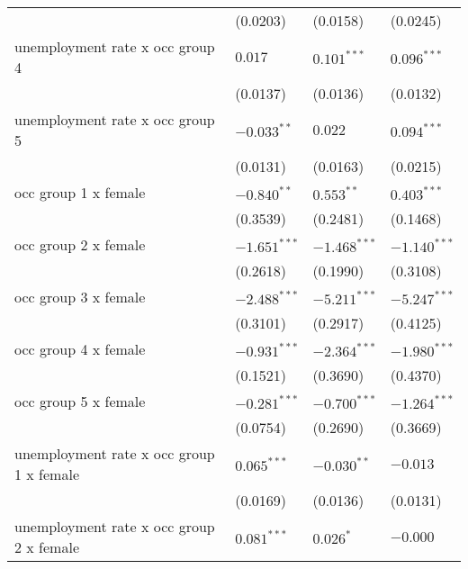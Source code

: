 \begin{tabular}{llll}
                                         &           (0.0203) &           (0.0158) &           (0.0245) \\
unemployment rate x occ group 4          &            $0.017$ &      $0.101^{***}$ &      $0.096^{***}$ \\
                                         &           (0.0137) &           (0.0136) &           (0.0132) \\
unemployment rate x occ group 5          &      $-0.033^{**}$ &            $0.022$ &      $0.094^{***}$ \\
                                         &           (0.0131) &           (0.0163) &           (0.0215) \\
occ group 1 x female                     &      $-0.840^{**}$ &       $0.553^{**}$ &      $0.403^{***}$ \\
                                         &           (0.3539) &           (0.2481) &           (0.1468) \\
occ group 2 x female                     &     $-1.651^{***}$ &     $-1.468^{***}$ &     $-1.140^{***}$ \\
                                         &           (0.2618) &           (0.1990) &           (0.3108) \\
occ group 3 x female                     &     $-2.488^{***}$ &     $-5.211^{***}$ &     $-5.247^{***}$ \\
                                         &           (0.3101) &           (0.2917) &           (0.4125) \\
occ group 4 x female                     &     $-0.931^{***}$ &     $-2.364^{***}$ &     $-1.980^{***}$ \\
                                         &           (0.1521) &           (0.3690) &           (0.4370) \\
occ group 5 x female                     &     $-0.281^{***}$ &     $-0.700^{***}$ &     $-1.264^{***}$ \\
                                         &           (0.0754) &           (0.2690) &           (0.3669) \\
unemployment rate x occ group 1 x female &      $0.065^{***}$ &      $-0.030^{**}$ &           $-0.013$ \\
                                         &           (0.0169) &           (0.0136) &           (0.0131) \\
unemployment rate x occ group 2 x female &      $0.081^{***}$ &          $0.026^*$ &           $-0.000$ \\

\end{tabular}
